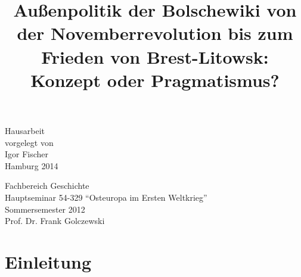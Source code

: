 \documentclass[12pt,headsepline,a4paper]{scrartcl}
\begin{document}
\begin{titlepage}
\date{}

 

\title{\Large Außenpolitik der Bolschewiki von der Novemberrevolution bis zum Frieden von Brest-Litowsk: Konzept oder Pragmatismus?}
{\let\newpage\relax\maketitle}


\begin{center}
\vfill
Hausarbeit\\
vorgelegt von\\
Igor Fischer \\
\null
Hamburg 2014
\vfill
\end{center}

\begin{minipage}{0.5\textwidth}
\begin{flushleft} 
Fachbereich Geschichte\\
Hauptseminar 54-329 "`Osteuropa im Ersten Weltkrieg"' \\
Sommersemester 2012\\
Prof. Dr. Frank Golczewski
\end{flushleft}
\end{minipage}
\vline
\begin{minipage}{0.5\textwidth}
\begin{flushright} 
\end{flushright}
\end{minipage}


\end{titlepage}

\tableofcontents
\thispagestyle{empty}

\newpage

\section*{Einleitung}
 
\end{document}
